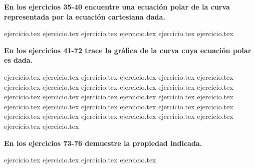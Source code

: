 \vspace{0.3cm}
\noindent\textbf{En los ejercicios 35-40 encuentre una ecuación polar de la curva representada por la ecuación cartesiana dada.}
\begin{enumerate}
    \setcounter{enumi}{35}
    {ejercicio.tex}
{ejercicio.tex}
{ejercicio.tex}
{ejercicio.tex}
{ejercicio.tex}
{ejercicio.tex}
\end{enumerate}

\vspace{0.3cm}
\noindent\textbf{En los ejercicios 41-72 trace la gráfica de la curva cuya ecuación polar es dada.}
\begin{enumerate}
    \setcounter{enumi}{40}
    {ejercicio.tex}
{ejercicio.tex}
{ejercicio.tex}
{ejercicio.tex}
{ejercicio.tex}
{ejercicio.tex}
{ejercicio.tex}
{ejercicio.tex}
{ejercicio.tex}
{ejercicio.tex}
{ejercicio.tex}
{ejercicio.tex}
{ejercicio.tex}
{ejercicio.tex}
{ejercicio.tex}
{ejercicio.tex}
{ejercicio.tex}
{ejercicio.tex}
{ejercicio.tex}
{ejercicio.tex}
{ejercicio.tex}
{ejercicio.tex}
{ejercicio.tex}
{ejercicio.tex}
{ejercicio.tex}
{ejercicio.tex}
{ejercicio.tex}
{ejercicio.tex}
{ejercicio.tex}
{ejercicio.tex}
{ejercicio.tex}
{ejercicio.tex}
\end{enumerate}

\vspace{0.3cm}
\noindent\textbf{En los ejercicios 73-76 demuestre la propiedad indicada.}
\begin{enumerate}
    \setcounter{enumi}{72}
    {ejercicio.tex}
{ejercicio.tex}
{ejercicio.tex}
{ejercicio.tex}
\end{enumerate}

